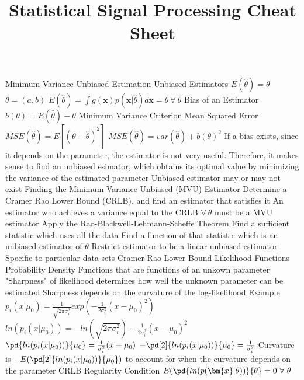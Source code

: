 \documentclass[14pt]{extarticle}
\title{Statistical Signal Processing Cheat Sheet}
\begin{document}
	\maketitle
	
	
	\begin{outline}		
		\1	Minimum Variance Unbiased Estimation	%
			\2	Unbiased Estimators
				\3	$E(\hat{\theta}) = \theta$
				\3	$\theta = (a,b)$
				\3	$E(\hat{\theta}) = \int g(\bm{x}) p(\bm{x} | \hat{\theta}) d\bm{x} = \theta~\forall~\theta$
			\2	Bias of an Estimator
				\3	$b(\theta) = E(\hat{\theta}) - \theta$
			\2	Minimum Variance Criterion
				\3	Mean Squared Error
					\4	$MSE(\hat{\theta}) = E[(\theta - \hat{\theta})^2]$
					\4	$MSE(\hat{\theta}) = var(\hat{\theta}) + b(\theta)^2$
				\3	If a bias exists, since it depends on the parameter, the estimator
						is not very useful.  Therefore, it makes sense to find an unbiased
						esimator, which obtains its optimal value by minimizing the variance
						of the estimated parameter
				\3	Unbiased estimator may or may not exist
			\2	Finding the Minimum Variance Unbiased (MVU) Estimator
				\3	Determine a Cramer Rao Lower Bound (CRLB), and find an estimator that satisfies it
					\4	An estimator who achieves a variance equal to the CRLB $\forall~\theta$ must be a MVU estimator
				\3	Apply the Rao-Blackwell-Lehmann-Scheffe Theorem
					\4	Find a sufficient statistic which uses all the data
					\4	Find a function of that statistic which is an unbiased estimator of $\theta$
				\3	Restrict estimator to be a linear unbiased estimator
					\4	Specific to particular data sets
		\1	Cramer-Rao Lower Bound	%
			\2	Likelihood Functions
				\3	Probability Density Functions that are functions of an unkown parameter
				\3	"Sharpness" of likelihood determines how well the unknown parameter can be estimated
				\3	Sharpness depends on the curvature of the log-likelihood
				\3	Example
					\4	$p_i(x | \mu_0) = \frac{1}{\sqrt{2\pi \sigma_i^2 }} exp(-\frac{1}{2\sigma_i^2}(x - \mu_0)^2)$
					\4	$ln(p_i(x | \mu_0)) = -ln(\sqrt{2\pi \sigma_i^2}) - \frac{1}{2\sigma_i^2}(x - \mu_0)^2$
					\4	$\pd{ln(p_i(x | \mu_0))}{\mu_0} = \frac{1}{\sigma_i^2}(x - \mu_0)$
					\4	$-\pd[2]{ln(p_i(x | \mu_0))}{\mu_0} = \frac{1}{\sigma_i^2}$
				\3	Curvature is $-E(\pd[2]{ln(p_i(x | \mu_0))}{\mu_0})$ to account for 
						when the curvature depends on the parameter
			\2	CRLB
				\3	Regularity Condition
					\4	$E(\pd{ln(p(\bm{x} | \theta))}{\theta} = 0~\forall~\theta$

\end{outline}
\end{document}
